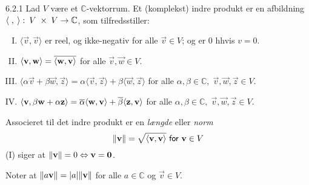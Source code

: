 \begin{definition}{6.2.1}
	Lad $V$ være et $\mathbb{C}$-vektorrum. Et (komplekst) indre produkt er en
	afbildning $\langle\;,\:\rangle:\:V\;\times\;V\rightarrow\mathbb{C}$, som
	tilfredsstiller:
	\begin{enumerate}[(I)]
		\item $\langle\vec{v},\vec{v}\rangle$ er reel, og ikke-negativ for alle
			$\vec{v} \in V$; og er 0 hhvis $v = 0$.
		\item $\langle\mathbf{v},\mathbf{w}\rangle =
			\overline{\langle\mathbf{w},\mathbf{v}\rangle}$ for alle $\vec{v},\vec{w} \in
			V$.
		\item $\langle\alpha\vec{v} + \beta\vec{w},\vec{z}\rangle
			= \alpha\langle\vec{v},\vec{z}\rangle + \beta\langle\vec{w},\vec{z}
			\rangle$ for alle $\alpha,\beta \in \mathbb{C},\;\vec{v},\vec{w},
			\vec{z} \in V$.
		\item $\langle\mathbf{v}, \beta\mathbf{w} + \alpha\mathbf{z}\rangle =
			\overline{\alpha}\langle\mathbf{w},\mathbf{v}\rangle +
			\overline{\beta}\langle\mathbf{z},\mathbf{v} \rangle$ for alle $\alpha,\beta
			\in \mathbb{C},\;\vec{v},\vec{w}, \vec{z} \in V$.
	\end{enumerate}
	Associeret til det indre produkt er en \emph{længde} eller \emph{norm}
	\[
		\lVert\mathbf{v}\rVert = \sqrt{\langle\mathbf{v},\mathbf{v}\rangle}\textsf{ for }
		\mathbf{v} \in V
	\]
	(I) siger at $\lVert\mathbf{v}\rVert = 0 \Leftrightarrow \mathbf{v} = \mathbf{0}$.

	\noindent
	Noter at $\lVert a\mathbf{v}\rVert = \lvert a\rvert\lVert\mathbf{v}\rVert$ for alle 
	$a \in \mathbb{C}$ og $\vec{v} \in V$.
\end{definition}

